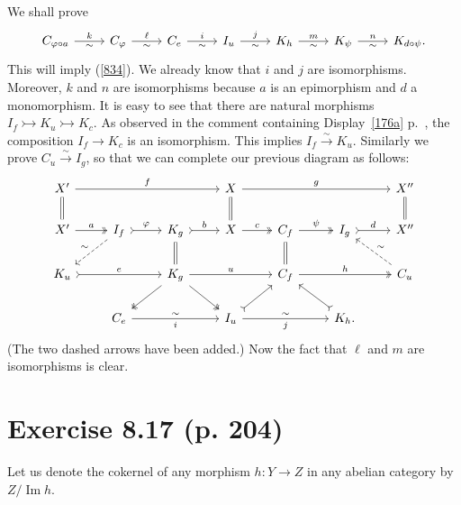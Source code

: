 \documentclass[12pt]{article}
\theoremstyle{remark}%
\newcommand{\mono}{\rightarrowtail}
\newcommand{\p}{\varphi}
\newcommand{\xr}{\xrightarrow}
\newcommand{\ccd}{the comment containing Display}
\DeclareMathOperator{\Ima}{Im}
\begin{document}
We shall prove 
$$
\begin{tikzcd}
C_{\p\circ a}\ar{r}{k}[swap]{\sim}&C_\p\ar{r}{\ell}[swap]{\sim}&C_e\ar{r}{i}[swap]{\sim}&I_u\ar{r}{j}[swap]{\sim}&K_h\ar{r}{m}[swap]{\sim}&K_\psi\ar{r}{n}[swap]{\sim}&K_{d\circ\psi}.
\end{tikzcd}
$$
This will imply (\ref{834}). We already know that $i$ and $j$ are isomorphisms. Moreover, $k$ and $n$ are isomorphisms because $a$ is an epimorphism and $d$ a monomorphism. It is easy to see that there are natural morphisms $I_f\mono K_u\mono K_c$. As observed in \ccd\ \eqref{176a} p.~\pageref{176a}, the composition $I_f\to K_c$ is an isomorphism. This implies $I_f\xr\sim K_u$. Similarly we prove $C_u\xr\sim I_g$, so that we can complete our previous diagram as follows: 
$$
\begin{tikzcd}
X'\ar{rrr}{f}\ar[equal]{d}&&&X\ar[equal]{d}\ar{rrr}{g}&&&X''\ar[equal]{d}\\ 
X'\ar[two heads]{r}{a}&I_f\ar[dashed]{dl}[swap]{\sim}\ar[tail]{r}{\p}&K_g\ar[equal]{d}\ar[tail]{r}{b}&X\ar[two heads]{r}{c}&C_f\ar[equal]{d}\ar[two heads]{r}{\psi}&I_g\ar[tail]{r}{d}&X''\\ 
K_u\ar[tail]{rr}{e}&&K_g\ar[two heads]{dl}\ar[two heads]{dr}\ar{rr}{u}&&C_f\ar[two heads]{rr}{h}&&C_u\ar[dashed]{ul}[swap]{\sim}\\ 
&C_e\ar{rr}{\sim}[swap]{i}&&I_u\ar[tail]{ur}\ar{rr}{\sim}[swap]{j}&&K_h.\ar[tail]{ul}
\end{tikzcd}
$$ 
(The two dashed arrows have been added.) Now the fact that $\ell$ and $m$ are isomorphisms is clear. 
%
\section{Exercise 8.17 (p. 204)}\label{817} 
%
Let us denote the cokernel of any morphism $h:Y\to Z$ in any abelian category by $Z/\Ima h$. 
\end{document}
